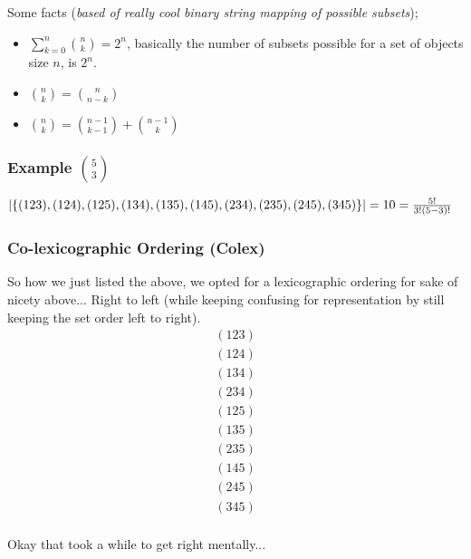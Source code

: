 \documentclass{article}
\begin{document}
Some facts ({\em based of really cool binary string mapping of possible subsets});
\begin{itemize}
  \item $\sum_{k=0}^{n}{\binom{n}{k}} = 2^n$, basically the number of subsets possible for a set of objects size $n$, is $2^n$.
  \item $\binom{n}{k} = \binom{n}{n-k}$
  \item $\binom{n}{k} = \binom{n-1}{k-1} + \binom{n-1}{k}$
\end{itemize}

\subsubsection*{Example $\binom{5}{3}$}
\begin{math}
|\{(123),(124),(125),(134),(135),(145),(234),(235),(245),(345)\}|\\
= 10 = \frac{5!}{3!(5-3)!}
\end{math}

\subsubsection*{Co-lexicographic Ordering (Colex)}
So how we just listed the above, we opted for a lexicographic ordering for sake of nicety above... Right to left (while keeping confusing for representation by still keeping the set order left to right).
\begin{align}
(123) \nonumber \\ 
(124) \nonumber \\
(134) \nonumber \\ 
(234) \nonumber \\
(125) \nonumber \\
(135) \nonumber \\ 
(235) \nonumber \\ 
(145) \nonumber \\ 
(245) \nonumber \\ 
(345) \nonumber \\ 
\end{align}

Okay that took a while to get right mentally...
\end{document}
